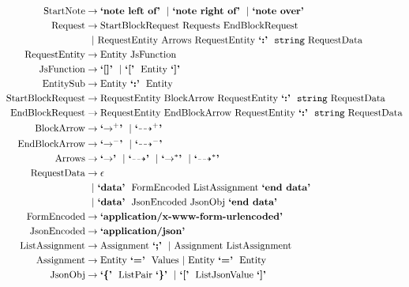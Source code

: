 \documentclass[11pt]{article}
\begin{document}
\begin{align*}
\nt{StartNote} &  \rightarrow \terminal{note left of}\ \opt \terminal{note right of}\ \opt \terminal{note over}\\
\nt{Request} & \rightarrow \nt{StartBlockRequest}\ \nt{Requests}\ \nt{EndBlockRequest}\\
        &\ \ \opt \nt{RequestEntity}\ \nt{Arrows}\ \nt{RequestEntity}\ \terminal{:}\ \str \nt{RequestData}\\
\nt{RequestEntity} & \rightarrow \nt{Entity}\ \nt{JsFunction}\\
\nt{JsFunction} & \rightarrow \terminal{[]}\ \opt \terminal{[}\ \nt{Entity}\ \terminal{]}\\
\nt{EntitySub} & \rightarrow \nt{Entity}\ \terminal{:}\ \nt{Entity}\\
\nt{StartBlockRequest} & \rightarrow \nt{RequestEntity}\ \nt{BlockArrow}\ \nt{RequestEntity}\ \terminal{:}\ \str \nt{RequestData}\\
\nt{EndBlockRequest} & \rightarrow \nt{RequestEntity}\ \nt{EndBlockArrow}\ \nt{RequestEntity}\ \terminal{:}\ \str \nt{RequestData}\\
\nt{BlockArrow} & \rightarrow \terminal{$\rightarrow^+$}\ \opt \terminal{$\dashrightarrow^+$}\\
\nt{EndBlockArrow} & \rightarrow \terminal{$\rightarrow^-$}\ \opt \terminal{$\dashrightarrow^-$}\\
\nt{Arrows} & \rightarrow \terminal{$\rightarrow$}\ \opt \terminal{$\dashrightarrow$}\ \opt \terminal{$\rightarrow^*$}\ \opt \terminal{$\dashrightarrow^*$}\\
\nt{RequestData}  & \rightarrow  \epsilon\\
				&\ \ \opt \terminal{data}\ \nt{FormEncoded}\ \nt{ListAssignment}\ \terminal{end data}\\
			   &\ \ \opt \terminal{data}\ \nt{JsonEncoded}\ \nt{JsonObj}\ \terminal{end data}\\
\nt{FormEncoded} & \rightarrow \terminal{application/x-www-form-urlencoded}\\
\nt{JsonEncoded} & \rightarrow \terminal{application/json}\\
\nt{ListAssignment} & \rightarrow \nt{Assignment}\ \terminal{;}\ \opt \nt{Assignment}\ \nt{ListAssignment}\\
\nt{Assignment} & \rightarrow \nt{Entity}\ \terminal{=}\ \nt{Values}\ \opt \nt{Entity}\ \terminal{=}\ \nt{Entity}\\
\nt{JsonObj} & \rightarrow \terminal{\{}\ \nt{ListPair}\ \terminal{\}}\ \opt \terminal{[}\ \nt{ListJsonValue}\ \terminal{]}\\

\end{align*}
\end{document}
